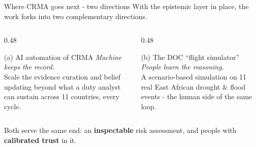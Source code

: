 \documentclass[aspectratio=3218]{beamer}
\begin{document}
\begin{frame}{Where CRMA goes next - two directions}
	With the epistemic layer in place, the work forks into two complementary
	directions.
	\vspace{1ex}
	\begin{columns}[T]
		\begin{column}{0.48\textwidth}
			\begin{block}{(a) AI automation of CRMA}
				\emph{Machine keeps the record.} \\[0.5ex]
				Scale the evidence curation and belief updating beyond what a
				duty analyst can sustain across 11 countries, every cycle.
			\end{block}
		\end{column}
		\begin{column}{0.48\textwidth}
			\begin{block}{(b) The DOC ``flight simulator''}
				\emph{People learn the reasoning.} \\[0.5ex]
				A scenario-based simulation on 11 real East African
				drought \& flood events - the human side of the same loop.
			\end{block}
		\end{column}
	\end{columns}
	\vspace{1ex}
	\centering
	Both serve the same end: an \textbf{inspectable} risk assessment, and people
	with \textbf{calibrated trust} in it.
\end{frame}
\end{document}
